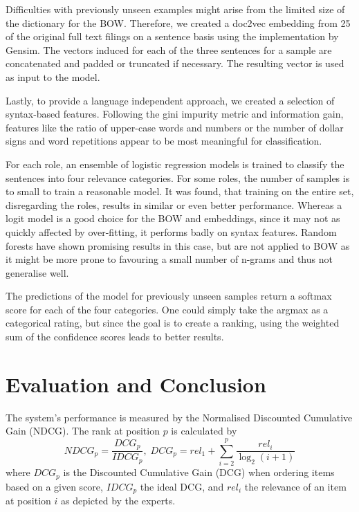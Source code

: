 Difficulties with previously unseen examples might arise from the limited size of the dictionary for the BOW.
Therefore, we created a doc2vec\cite{le2014distributed} embedding from 25 of the original full text filings on a sentence basis using the implementation by Gensim\cite{gensim}.
The vectors induced for each of the three sentences for a sample are concatenated and padded or truncated if necessary.
The resulting vector is used as input to the model.

Lastly, to provide a language independent approach, we created a selection of syntax-based features.
Following the gini impurity metric and information gain, features like the ratio of upper-case words and numbers or the number of dollar signs and word repetitions appear to be most meaningful for classification.

For each role, an ensemble of logistic regression models is trained to classify the sentences into four relevance categories.
For some roles, the number of samples is to small to train a reasonable model.
It was found, that training on the entire set, disregarding the roles, results in similar or even better performance.
Whereas a logit model is a good choice for the BOW and embeddings, since it may not as quickly affected by over-fitting, it performs badly on syntax features.
Random forests have shown promising results in this case, but are not applied to BOW as it might be more prone to favouring a small number of n-grams and thus not generalise well.

The predictions of the model for previously unseen samples return a softmax score for each of the four categories.
One could simply take the argmax as a categorical rating, but since the goal is to create a ranking, using the weighted sum of the confidence scores leads to better results.

\section{Evaluation and Conclusion}
The system's performance is measured by the Normalised Discounted Cumulative Gain (NDCG). The rank at position $p$ is calculated by
\begin{equation}
NDCG_p = \frac{DCG_p}{IDCG_p},\;
DCG_p = rel_1 + \sum_{i=2}^{p} \frac{rel_i}{\log_2(i+1)}
\end{equation}
where $DCG_p$ is the Discounted Cumulative Gain (DCG) when ordering items based on a given score, $IDCG_p$ the ideal DCG, and $rel_i$ the relevance of an item at position $i$ as depicted by the experts.

